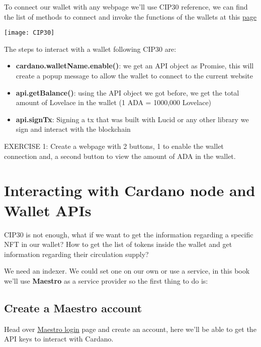 To connect our wallet with any webpage we'll use \gls{CIP}30 reference, we can find the list of methods to connect and invoke the functions of the wallets at this \href{https://www.cardano-caniuse.io/}{page}

\texttt{[image: CIP30]}

The steps to interact with a wallet following CIP30 are:

\begin{itemize}
    \item \textbf{cardano.{walletName}.enable()}: we get an API object as Promise, this will create a popup message to allow the wallet to connect to the current website
    \item \textbf{api.getBalance()}: using the API object we got before, we get the total amount of Lovelace in the wallet (1 ADA = 1000,000 Lovelace)
    \item \textbf{api.signTx}: Signing a tx that was built with Lucid or any other library we sign and interact with the blockchain 
\end{itemize}

\begin{remark}
    EXERCISE 1: Create a webpage with 2 buttons, 1 to enable the wallet connection and, a second button to view the amount of ADA in the wallet.
\end{remark}




\section{Interacting with Cardano node and Wallet APIs}

CIP30 is not enough, what if we want to get the information regarding a specific NFT in our wallet?
How to get the list of tokens inside the wallet and get information regarding their circulation supply?

We need an indexer. We could set one on our own or use a service, in this book we'll use \textbf{Maestro} as a service provider so the first thing to do is:

\subsection{Create a Maestro account}

Head over \href{https://dashboard.gomaestro.org/login}{Maestro login} page and create an account, here we'll be able to get the API keys to interact with Cardano.

